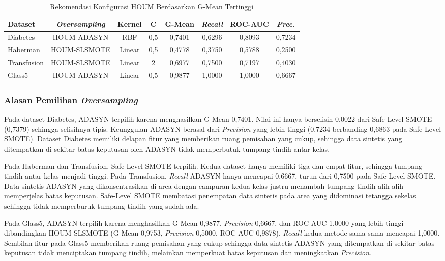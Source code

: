 \begin{table}[H]
\centering
\caption{Rekomendasi Konfigurasi HOUM Berdasarkan G-Mean Tertinggi}
\label{table:4.rekomendasi_konfigurasi}
\footnotesize
\begin{tabular}{|l|c|c|c|c|c|c|c|}
\hline
\textbf{Dataset} & \textbf{\textit{Oversampling}} & \textbf{Kernel} & \textbf{C} & \textbf{G-Mean} & \textbf{\textit{Recall}} & \textbf{ROC-AUC} & \textbf{\textit{Prec.}} \\
\hline
Diabetes & HOUM-ADASYN & RBF & 0,5 & 0,7401 & 0,6296 & 0,8093 & 0,7234 \\
Haberman & HOUM-SLSMOTE & Linear & 0,5 & 0,4778 & 0,3750 & 0,5788 & 0,2500 \\
Transfusion & HOUM-SLSMOTE & Linear & 2 & 0,6977 & 0,7500 & 0,7197 & 0,4030 \\
\hline
Glass5 & HOUM-ADASYN & Linear & 0,5 & 0,9877 & 1,0000 & 1,0000 & 0,6667 \\
\hline
\end{tabular}
\end{table}

\subsubsection{Alasan Pemilihan \textit{Oversampling}}
Pada dataset Diabetes, ADASYN terpilih karena menghasilkan G-Mean 0,7401. Nilai ini hanya berselisih 0,0022 dari Safe-Level SMOTE (0,7379) sehingga selisihnya tipis. Keunggulan ADASYN berasal dari \textit{Precision} yang lebih tinggi (0,7234 berbanding 0,6863 pada Safe-Level SMOTE). Dataset Diabetes memiliki delapan fitur yang memberikan ruang pemisahan yang cukup, sehingga data sintetis yang ditempatkan di sekitar batas keputusan oleh ADASYN tidak memperbutuk tumpang tindih antar kelas.

Pada Haberman dan Transfusion, Safe-Level SMOTE terpilih. Kedua dataset hanya memiliki tiga dan empat fitur, sehingga tumpang tindih antar kelas menjadi tinggi. Pada Transfusion, \textit{Recall} ADASYN hanya mencapai 0,6667, turun dari 0,7500 pada Safe-Level SMOTE. Data sintetis ADASYN yang dikonsentrasikan di area dengan campuran kedua kelas justru menambah tumpang tindih alih-alih memperjelas batas keputusan. Safe-Level SMOTE membatasi penempatan data sintetis pada area yang didominasi tetangga sekelas sehingga tidak memperburuk tumpang tindih yang sudah ada.

Pada Glass5, ADASYN terpilih karena menghasilkan G-Mean 0,9877, \textit{Precision} 0,6667, dan ROC-AUC 1,0000 yang lebih tinggi dibandingkan HOUM-SLSMOTE (G-Mean 0,9753, \textit{Precision} 0,5000, ROC-AUC 0,9878). \textit{Recall} kedua metode sama-sama mencapai 1,0000. Sembilan fitur pada Glass5 memberikan ruang pemisahan yang cukup sehingga data sintetis ADASYN yang ditempatkan di sekitar batas keputusan tidak menciptakan tumpang tindih, melainkan memperkuat batas keputusan dan meningkatkan \textit{Precision}. \par

